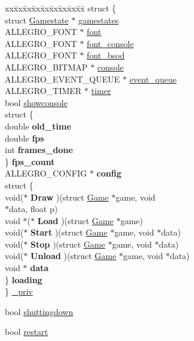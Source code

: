 \begin{DoxyCompactItemize}
\begin{tabbing}
\end{tabbing}\item 
\begin{tabbing}
xx\=xx\=xx\=xx\=xx\=xx\=xx\=xx\=xx\=\kill
struct \{\\
\>struct \hyperlink{structGamestate}{Gamestate} $\ast$ \hyperlink{structGame_a985ae6ac3716fe725adbe9fc995ef23d}{gamestates}\\
\>ALLEGRO\_FONT $\ast$ \hyperlink{structGame_a455bfdaacd5f2bda80b640c02ec3250e}{font}\\
\>ALLEGRO\_FONT $\ast$ \hyperlink{structGame_a692f2c3ec0f3e956aa8bdac00a864bf8}{font\_console}\\
\>ALLEGRO\_FONT $\ast$ \hyperlink{structGame_a7d65ca9283d2c8ad178be068fe74c986}{font\_bsod}\\
\>ALLEGRO\_BITMAP $\ast$ \hyperlink{structGame_aa2e3d0922374dc870a1aeabf9e3b8ae2}{console}\\
\>ALLEGRO\_EVENT\_QUEUE $\ast$ \hyperlink{structGame_a820782e408ff7a704dc12af67eb0c44f}{event\_queue}\\
\>ALLEGRO\_TIMER $\ast$ \hyperlink{structGame_a8d6d4f06c6412d085112cd007977d868}{timer}\\
\>bool \hyperlink{structGame_ab1dafa4ce0c3526439418ac24bf616d8}{showconsole}\\
\>struct \{\\
\>\>double {\bfseries old\_time}\\
\>\>double {\bfseries fps}\\
\>\>int {\bfseries frames\_done}\\
\>\} {\bfseries fps\_count}\\
\>ALLEGRO\_CONFIG $\ast$ {\bfseries config}\\
\>struct \{\\
\>\>void($\ast$ {\bfseries Draw} )(struct \hyperlink{structGame}{Game} $\ast$game, void \\
\>\>\>$\ast$data, float p)\\
\>\>void $\ast$($\ast$ {\bfseries Load} )(struct \hyperlink{structGame}{Game} $\ast$game)\\
\>\>void($\ast$ {\bfseries Start} )(struct \hyperlink{structGame}{Game} $\ast$game, void $\ast$data)\\
\>\>void($\ast$ {\bfseries Stop} )(struct \hyperlink{structGame}{Game} $\ast$game, void $\ast$data)\\
\>\>void($\ast$ {\bfseries Unload} )(struct \hyperlink{structGame}{Game} $\ast$game, void $\ast$data)\\
\>\>void $\ast$ {\bfseries data}\\
\>\} {\bfseries loading}\\
\} \hyperlink{structGame_a2ebba7014575922908ee8cd5b6a92474}{\_priv}\\

\end{tabbing}\item 
bool \hyperlink{structGame_a9a1d33be7ec00f87ede16b96bd2df312}{shuttingdown}
\item 
bool \hyperlink{structGame_aad2035c807bd99529d1a07e443e0016b}{restart}
\end{DoxyCompactItemize}


